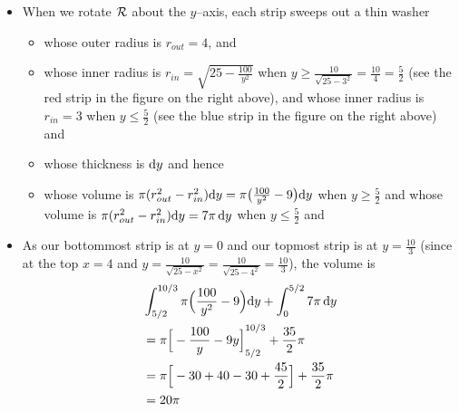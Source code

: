 \begin{solution}
\begin{itemize}
\item When we rotate $\mathcal{R}$ about the $y$--axis, each strip sweeps out a thin washer
\begin{itemize}
\item
whose outer radius is $r_{out}=4$, and
\item
whose inner radius is $r_{in}= \sqrt{25-\frac{100}{y^2}}$ when
$y\ge \frac{10}{\sqrt{25-3^2}} = \frac{10}{4}
=\frac{5}{2}$ (see the red strip in the figure on the right above),  and
whose inner radius is $r_{in}= 3$ when $y\le \frac{5}{2}$
(see the blue strip in the figure on the right above) and
\item
whose thickness is $\mathrm{d}y$ and hence
\item
whose volume is
$\pi(r_{out}^2 - r_{in}^2)\mathrm{d}y = \pi\big(\frac{100}{y^2}-9\big)\mathrm{d}y$
when $y\ge \frac{5}{2}$ and  whose volume is
$\pi(r_{out}^2 - r_{in}^2)\mathrm{d}y = 7 \pi\,\mathrm{d}y$
when $y\le \frac{5}{2}$ and

\end{itemize}
\item As our bottommost strip is at $y=0$ and our topmost
strip is at $y=\frac{10}{3}$ (since at the top $x=4$ and $y=  \frac{10}{\sqrt{25-x^2}}
=\frac{10}{\sqrt{25-4^2}} =\frac{10}{3}$), the volume is
\begin{align*}
&\int _{5/2}^{10/3}  \pi\Big(\frac{100}{y^2}-9\Big)\mathrm{d}y
                                                         +\int _ 0^{5/2}7 \pi\,\mathrm{d}y \\
&=\pi{\Big[-\frac{100}{y}-9y\Big]}_{5/2}^{10/3} +\frac{35}{2}\pi\\
&=\pi \Big[-30+40-30+\frac{45}{2}\Big] +\frac{35}{2}\pi\\
&=20\pi
\end{align*}
\end{itemize}

\end{solution}



